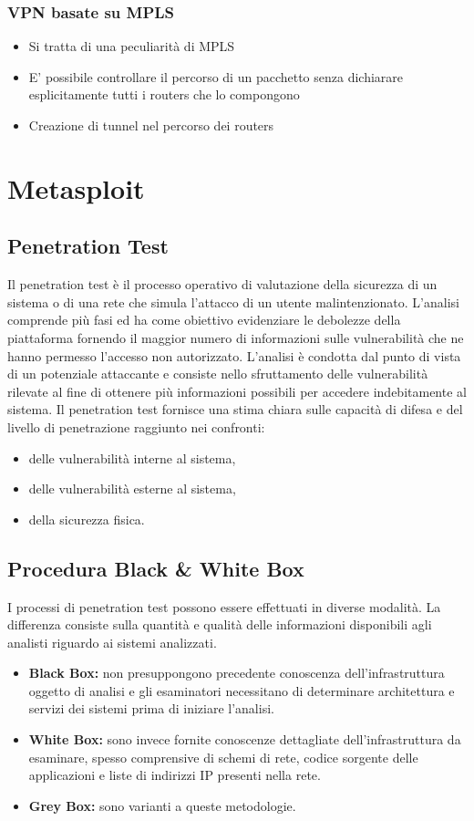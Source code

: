 \documentclass[8pt]{extarticle}
\begin{document}
\subsubsection{VPN basate su MPLS}
\begin{itemize}
    \item Si tratta di una peculiarità  di MPLS
    \item E’ possibile controllare il percorso di un pacchetto senza dichiarare esplicitamente tutti i 
    routers che lo compongono
    \item Creazione di tunnel nel percorso dei routers
\end{itemize}
\section{Metasploit}
\subsection{Penetration Test}
Il penetration test è il processo operativo di valutazione della sicurezza di un sistema o di una rete che 
simula l'attacco di un utente malintenzionato. L'analisi comprende più fasi ed ha come obiettivo evidenziare 
le debolezze della piattaforma fornendo il maggior numero di informazioni sulle vulnerabilità che ne hanno 
permesso l'accesso non autorizzato. L'analisi è condotta dal punto di vista di un potenziale attaccante e 
consiste nello sfruttamento delle vulnerabilità rilevate al fine di ottenere più informazioni possibili 
per accedere indebitamente al sistema. Il penetration test fornisce una stima chiara sulle capacità di 
difesa e del livello di penetrazione raggiunto nei confronti: 
\begin{itemize}
    \item delle vulnerabilità interne al sistema,
    \item delle vulnerabilità esterne al sistema,
    \item della sicurezza fisica.
\end{itemize}
\subsection{Procedura Black \& White Box}
I processi di penetration test possono essere effettuati in diverse modalità. La differenza consiste 
sulla quantità e qualità delle informazioni disponibili agli analisti riguardo ai sistemi analizzati.
\begin{itemize}
    \item \textbf{Black Box:} non presuppongono precedente conoscenza dell'infrastruttura oggetto di analisi 
    e gli esaminatori necessitano di determinare architettura e servizi dei sistemi prima di iniziare l'analisi.
    \item \textbf{White Box:} sono invece fornite conoscenze dettagliate dell'infrastruttura da esaminare, 
    spesso comprensive di schemi di rete, codice sorgente delle applicazioni e liste di indirizzi 
    IP presenti nella rete.
    \item \textbf{Grey Box:} sono varianti a queste metodologie.
\end{itemize}
\end{document}
